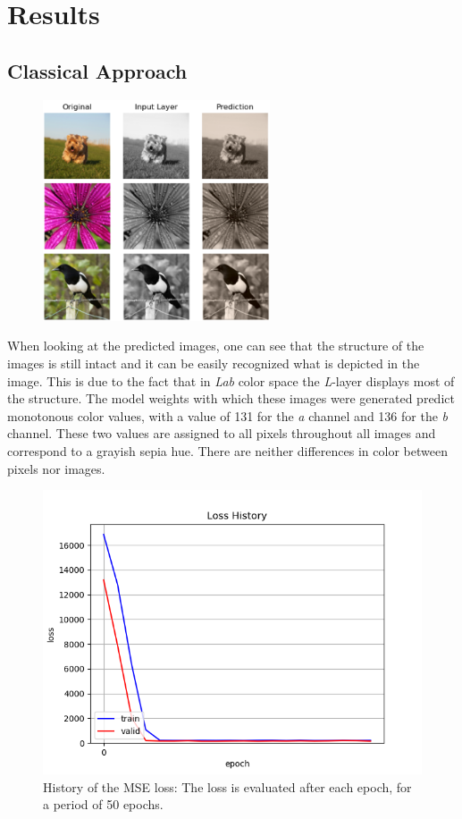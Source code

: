 \documentclass[12pt,letterpaper]{article}
\begin{document}
\section{Results}
\subsection{Classical Approach}
\begin{figure}[hbt]
	\centering
	\includegraphics[width=0.6\textwidth]{class_predict.png}
	\caption{}
	\label{classical}
\end{figure}
When looking at the predicted images, one can see that the structure of the images is still intact and it can be easily recognized what is depicted in the image. This is due to the fact that in \emph{Lab} color space the \emph{L}-layer displays most of the structure. The model weights with which these images were generated predict monotonous color values, with a value of 131 for the \emph{a} channel and 136 for the \emph{b} channel. These two values are assigned to all pixels throughout all images and correspond to a grayish sepia hue. There are neither differences in color between pixels nor images.
\begin{figure}
	\centering
	\includegraphics[width=.65\textwidth]{loss_classical.png}
	\caption{History of the MSE loss: The loss is evaluated after each epoch, for a period of 50 epochs.}
	\label{loss_class}
\end{figure}
\end{document}
